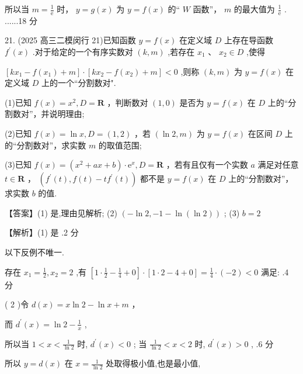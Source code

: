 \documentclass[10pt]{article}
\begin{document}
所以当 \(m = \frac{1}{\mathrm{e}}\) 时， \(y = g\left( x\right)\) 为 \(y = f\left( x\right)\) 的“ \(W\) 函数”， \(m\) 的最大值为 \(\frac{1}{\mathrm{e}}\) . ......18 分

21. (2025 高三二模闵行 21)已知函数 \(y = f\left( x\right)\) 在定义域 \(D\) 上存在导函数 \({f}^{\prime }\left( x\right)\) .对于给定的一个有序实数对 \(\left( {k,m}\right)\) ,若存在 \({x}_{1}\text{ 、 }{x}_{2} \in  D\) ,使得

\(\left\lbrack  {k{x}_{1} - f\left( {x}_{1}\right)  + m}\right\rbrack   \cdot  \left\lbrack  {k{x}_{2} - f\left( {x}_{2}\right)  + m}\right\rbrack   < 0\) ,则称 \(\left( {k,m}\right)\) 为 \(y = f\left( x\right)\) 在定义域 \(D\) 上的一个“分割数对".

(1)已知 \(f\left( x\right)  = {x}^{2},D = \mathbf{R}\) ，判断数对 \(\left( {1,0}\right)\) 是否为 \(y = f\left( x\right)\) 在 \(D\) 上的“分割数对”，并说明理由;

(2)已知 \(f\left( x\right)  = \ln x,D = \left( {1,2}\right)\) ，若 \(\left( {\ln 2,m}\right)\) 为 \(y = f\left( x\right)\) 在区间 \(D\) 上的“分割数对”，求实数 \(m\) 的取值范围;

(3)已知 \(f\left( x\right)  = \left( {{x}^{2} + {ax} + b}\right)  \cdot  {\mathrm{e}}^{x},D = \mathbf{R}\) ，若有且仅有一个实数 \(a\) 满足对任意 \(t \in  \mathbf{R}\) ， \(\left( {{f}^{\prime }\left( t\right) ,f\left( t\right)  - t{f}^{\prime }\left( t\right) }\right)\) 都不是 \(y = f\left( x\right)\) 在 \(D\) 上的“分割数对”，求实数 \(b\) 的值.

【答案】(1) 是,理由见解析; (2) \(\left( {-\ln 2, - 1 - \ln \left( {\ln 2}\right) }\right)\) ; (3) \(b = 2\)

【解析】(1) 是 .2 分

以下反例不唯一.

存在 \({x}_{1} = \frac{1}{2},{x}_{2} = 2\) ,有 \(\left\lbrack  {1 \cdot  \frac{1}{2} - \frac{1}{4} + 0}\right\rbrack   \cdot  \left\lbrack  {1 \cdot  2 - 4 + 0}\right\rbrack   = \frac{1}{4} \cdot  \left( {-2}\right)  < 0\) 满足: .4 分

( 2 )令 \(d\left( x\right)  = x\ln 2 - \ln x + m\) ，

而 \({d}^{\prime }\left( x\right)  = \ln 2 - \frac{1}{x}\) ,

所以当 \(1 < x < \frac{1}{\ln 2}\) 时, \({d}^{\prime }\left( x\right)  < 0\) ; 当 \(\frac{1}{\ln 2} < x < 2\) 时, \({d}^{\prime }\left( x\right)  > 0\) , .6 分

所以 \(y = d\left( x\right)\) 在 \(x = \frac{1}{\ln 2}\) 处取得极小值,也是最小值,
\end{document}
